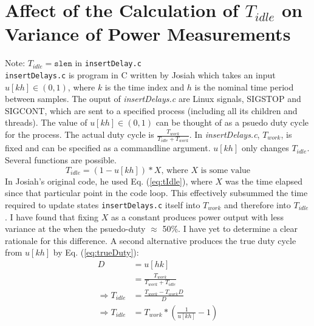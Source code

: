 \documentclass{article}
\newcommand{\mref}[1]{Eq. (\ref{#1})}
\begin{document}
\section{Affect of the Calculation of $T_{idle}$ on Variance of Power Measurements}
Note: $T_{idle}=\texttt{slen}$ in \texttt{insertDelay.c} \\
\texttt{insertDelays.c} is program in C written by Josiah which takes an input $u[kh] \in (0, 1)$, where $k$ is the time index and $h$ is the nominal time period between samples.  The ouput of \emph{insertDelays.c} are Linux signals, SIGSTOP and SIGCONT, which are sent to a specified process (including all its children and threads). The value of $u[kh] \in (0, 1)$ can be thought of as a psuedo duty cycle for the process.  The actual duty cycle is $\frac{T_{work}}{T_{idle}+T_{work}}$. In \emph{insertDelays.c}, $T_{work}$, is fixed and can be specified as a commandline argument.  $u[kh]$ only changes $T_{idle}$.  Several functions are possible.  
\begin{equation} \label{eq:tIdle} T_{idle}=(1-u[kh])*X\text{, where $X$ is some value} \end{equation}
In Josiah's original code, he used \mref{eq:tIdle}, where $X$ was the time elapsed since that particular point in the code loop. This effectively subsummed the time required to update states \texttt{insertDelays.c} itself into $T_{work}$ and therefore into $T_{idle}$.  I have found that fixing $X$ as a constant produces power output with less variance at the when the psuedo-duty $\approx$ 50\%.  I have yet to determine a clear rationale for this difference. A second alternative produces the true duty cycle from $u[kh]$ by \mref{eq:trueDuty}:
\begin{equation}  
	\begin{aligned} 
		D&=u[hk] \\
		 &=\frac{T_{work}}{T_{work}+T_{idle}} \\ 
		\Rightarrow T_{idle}&=\frac{T_{work}-T_{work}D}{D} \\
		\Rightarrow T_{idle}&=T_{work}*(\frac{1}{u[kh]}-1) 
	\end{aligned} 
	\label{eq:trueDuty}
\end{equation}
\end{document}
